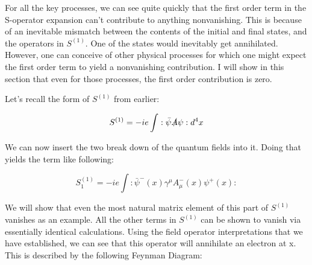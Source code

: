 \documentclass[a4]{article}
\begin{document}
    \begin{framed}
        For all the key processes, we can see quite quickly that the first order term in the S-operator expansion can't contribute to anything nonvanishing. This is because of
        an inevitable mismatch between the contents of the initial and final states, and the operators in $S^{(1)}$. One of the states would inevitably get annihilated.
        However, one can conceive of other physical processes for which one might expect the first order term to yield a nonvanishing contribution. I will show in this section
        that even for those processes, the first order contribution is zero.

        Let's recall the form of $S^{(1)}$ from earlier:

        \begin{equation}
            S^{(1)} = - i e \int :\bar{\psi} \slashed{A} \psi: d^{4} x
        \end{equation}

        We can now insert the two break down of the quantum fields into it. Doing that yields the term like following:

        \begin{equation}
            S_{1}^{(1)} = - i e \int :\bar{\psi}^{-} (x) \gamma^{\mu} A_{\mu}^{-} (x) \psi^{+} (x):
        \end{equation}

        We will show that even the most natural matrix element of this part of $S^{(1)}$ vanishes as an example. All the other terms in $S^{(1)}$ can be shown to vanish via essentially
        identical calculations. Using the field operator interpretations that we have established, we can see that this operator will annihilate an electron at x. This is described by
        the following Feynman Diagram: 
        
        \begin{center}



\end{center}
\end{framed}
\end{document}
